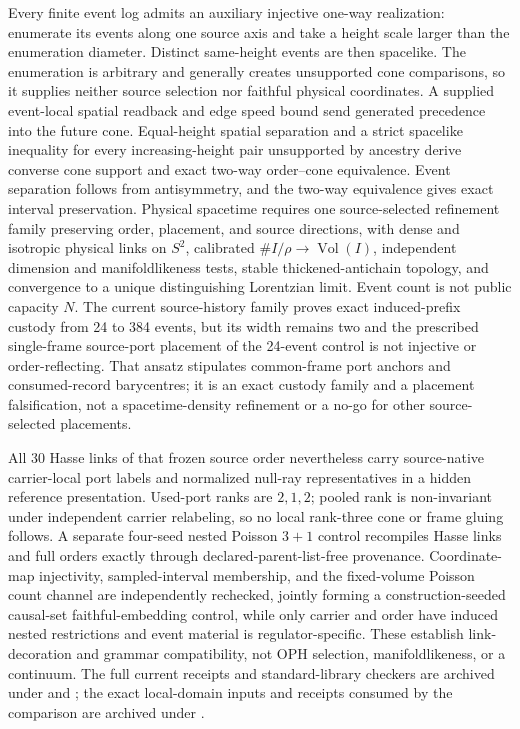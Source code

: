 Every finite event log admits an auxiliary injective one-way realization:
enumerate its events along one source axis and take a height scale larger than
the enumeration diameter. Distinct same-height events are then spacelike. The
enumeration is arbitrary and generally creates unsupported cone comparisons,
so it supplies neither source selection nor faithful physical coordinates.
A supplied event-local spatial readback and edge speed bound send generated
precedence into the future cone. Equal-height spatial separation and a strict
spacelike inequality for every increasing-height pair unsupported by ancestry
derive converse cone support and exact two-way order--cone equivalence. Event
separation follows from antisymmetry, and the two-way equivalence gives exact interval preservation. Physical spacetime requires one
source-selected refinement family preserving order, placement, and source
directions, with dense and isotropic physical links on \(S^2\), calibrated
\(\#I/\rho\to\operatorname{Vol}(I)\), independent dimension and
manifoldlikeness tests, stable thickened-antichain topology, and convergence
to a unique distinguishing Lorentzian limit. Event count is not public
capacity \(N\). The current source-history family proves exact induced-prefix
custody from 24 to 384 events, but its width remains two and the
prescribed single-frame source-port placement of the 24-event control is not
injective or order-reflecting. That ansatz stipulates common-frame port anchors
and consumed-record barycentres; it is an exact custody family and a placement
falsification, not a spacetime-density refinement or a no-go for other
source-selected placements.

All 30 Hasse links of that frozen source order nevertheless carry source-native
carrier-local port labels and normalized null-ray representatives in a hidden
reference presentation. Used-port ranks are \(2,1,2\); pooled rank is
non-invariant under independent carrier relabeling, so no local rank-three
cone or frame gluing follows. A separate four-seed nested Poisson
\(3+1\) control recompiles Hasse links and full orders exactly through
declared-parent-list-free provenance. Coordinate-map injectivity,
sampled-interval membership, and the fixed-volume Poisson count channel are
independently rechecked, jointly forming a construction-seeded causal-set
faithful-embedding control,
while only carrier and order have induced nested restrictions and event
material is regulator-specific. These
establish link-decoration and grammar compatibility, not OPH selection,
manifoldlikeness, or a continuum.
The full current receipts and standard-library checkers are archived under
 and
; the exact local-domain inputs and receipts
consumed by the comparison are archived under .

